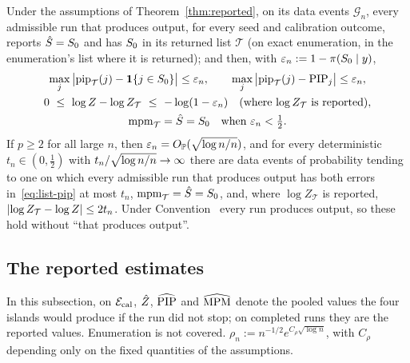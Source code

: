 \begin{suppcor}\label{cor:list}
Under the assumptions of Theorem~\ref{thm:reported}, on its data events $\mathcal G_n$, every admissible run that produces
output, for every seed and calibration outcome, reports $\hat S=S_0$ and has $S_0$ in its returned list $\mathcal T$ (on
exact enumeration, in the enumeration's list where it is returned); and then, with $\varepsilon_n:=1-\pi(S_0\mid y)$,
\begin{gather}
  \max_j\big|\mathrm{pip}_{\mathcal T}(j)-\ind{j\in\Sz}\big|\le\varepsilon_n,\qquad
  \max_j\big|\mathrm{pip}_{\mathcal T}(j)-\PIP_j\big|\le\varepsilon_n,\label{eq:list-pip}\\
  0\ \le\ \log Z-\log Z_{\mathcal T}\ \le\ -\log(1-\varepsilon_n)\quad\text{(where $\log Z_{\mathcal T}$ is reported)},\label{eq:list-z}\\
  \mathrm{mpm}_{\mathcal T}=\Shat=\Sz\quad\text{when }\varepsilon_n<\tfrac12 .\label{eq:list-mpm}
\end{gather}
If $p\ge2$ for all large $n$, then $\varepsilon_n=O_{\mathbb{P}}(\sqrt{\log n/n})$, and for every deterministic $t_n\in(0,\tfrac12)$ with
$t_n/\sqrt{\log n/n}\to\infty$ there are data events of probability tending to one on which every admissible run that produces output
has both errors in~\eqref{eq:list-pip} at most $t_n$, $\mathrm{mpm}_{\mathcal T}=\hat S=S_0$, and, where $\log Z_{\mathcal T}$ is
reported, $\lvert \log Z_{\mathcal T}-\log Z\rvert\le2t_n$. Under Convention~ every run produces output, so these hold
without ``that produces output''.
\end{suppcor}



\subsection{The reported estimates}\label{sec:outputs}

In this subsection, on $\mathcal E_{\mathrm{cal}}$, $\hat Z$, $\widehat{\mathrm{PIP}}$ and $\widehat{\mathrm{MPM}}$ denote the pooled values the four islands would produce if
the run did not stop; on completed runs they are the reported values. Enumeration is not covered.
$\rho_n:=n^{-1/2}e^{C_\rho\sqrt{\log n}}$, with $C_\rho$ depending only on the fixed quantities of the assumptions.

